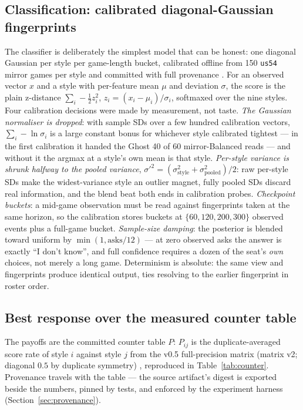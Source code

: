 \documentclass[11pt]{article}
\newcommand{\code}[1]{\texttt{#1}}
\newcommand{\usff}{\code{us54}}
\begin{document}
\subsection{Classification: calibrated diagonal-Gaussian fingerprints}
\label{sec:classify}

The classifier is deliberately the simplest model that can be honest: one diagonal
Gaussian per style per game-length bucket, calibrated offline from 150 \usff{} mirror
games per style and committed with full provenance \cite{artifact}. For an observed vector
$x$ and a style with per-feature mean $\mu$ and deviation $\sigma$, the score is the plain
z-distance $\sum_i -\tfrac12 z_i^2$, $z_i = (x_i - \mu_i)/\sigma_i$, softmaxed over the
nine styles. Four calibration decisions were made by measurement, not taste.
\emph{The Gaussian normaliser is dropped}: with sample SDs over a few hundred calibration
vectors, $\sum_i -\ln\sigma_i$ is a large constant bonus for whichever style calibrated
tightest --- in the first calibration it handed the Ghost 40 of 60 mirror-Balanced reads
--- and without it the argmax at a style's own mean is that style. \emph{Per-style
variance is shrunk halfway to the pooled variance},
$\sigma'^2 = (\sigma_{\text{style}}^2 + \sigma_{\text{pooled}}^2)/2$: raw per-style SDs
make the widest-variance style an outlier magnet, fully pooled SDs discard real
information, and the blend beat both ends in calibration probes. \emph{Checkpoint
buckets}: a mid-game observation must be read against fingerprints taken at the same
horizon, so the calibration stores buckets at $\{60, 120, 200, 300\}$ observed events plus
a full-game bucket. \emph{Sample-size damping}: the posterior is blended toward uniform by
$\min(1, \text{asks}/12)$ --- at zero observed asks the answer is exactly ``I don't
know'', and full confidence requires a dozen of the seat's \emph{own} choices, not merely
a long game. Determinism is absolute: the same view and fingerprints produce identical
output, ties resolving to the earlier fingerprint in roster order.

\subsection{Best response over the measured counter table}
\label{sec:bestrespond}

The payoffs are the committed counter table $P$: $P_{ij}$ is the duplicate-averaged score
rate of style $i$ against style $j$ from the v0.5 full-precision matrix (matrix v2;
diagonal $0.5$ by duplicate symmetry) \cite{matrixv2}, reproduced in
Table~\ref{tab:counter}. Provenance travels with the table --- the source artifact's
digest is exported beside the numbers, pinned by tests, and enforced by the experiment
harness (Section~\ref{sec:provenance}).
\end{document}
